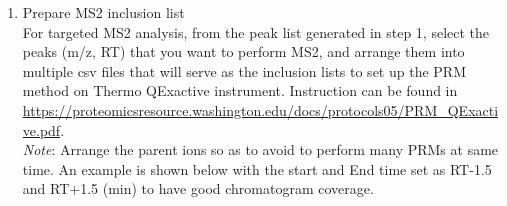 \documentclass[]{article}
\providecommand{\tightlist}{%
  \setlength{\itemsep}{0pt}\setlength{\parskip}{0pt}}
\begin{document}
\begin{enumerate}
\def\labelenumi{\arabic{enumi}.}
\tightlist
\item
  Prepare MS2 inclusion list\\
  For targeted MS2 analysis, from the peak list generated in step 1, select the peaks (m/z, RT) that you want to perform MS2, and arrange them into multiple csv files that will serve as the inclusion lists to set up the PRM method on Thermo QExactive instrument. Instruction can be found in \url{https://proteomicsresource.washington.edu/docs/protocols05/PRM_QExactive.pdf}.\\
  \emph{Note}: Arrange the parent ions so as to avoid to perform many PRMs at same time. An example is shown below with the start and End time set as RT-1.5 and RT+1.5 (min) to have good chromatogram coverage.
\end{enumerate}
\end{document}
